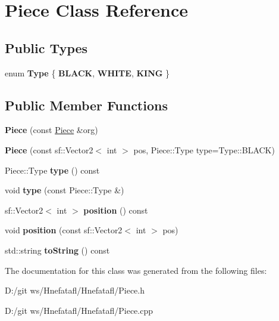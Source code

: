 \hypertarget{class_piece}{\section{Piece Class Reference}
\label{class_piece}
}
\subsection*{Public Types}
\begin{DoxyCompactItemize}
\item 
enum {\bfseries Type} \{ {\bfseries B\-L\-A\-C\-K}, 
{\bfseries W\-H\-I\-T\-E}, 
{\bfseries K\-I\-N\-G}
 \}
\end{DoxyCompactItemize}
\subsection*{Public Member Functions}
\begin{DoxyCompactItemize}
\item 
\hypertarget{class_piece_ade398b866a6f8eca384313ef38adb2b4}{{\bfseries Piece} (const \hyperlink{class_piece}{Piece} \&org)}\label{class_piece_ade398b866a6f8eca384313ef38adb2b4}

\item 
\hypertarget{class_piece_a7814f9f5f8ed57196c3baeca6fbada7c}{{\bfseries Piece} (const sf\-::\-Vector2$<$ int $>$ pos, Piece\-::\-Type type=Type\-::\-B\-L\-A\-C\-K)}\label{class_piece_a7814f9f5f8ed57196c3baeca6fbada7c}

\item 
\hypertarget{class_piece_a4888185e8742c81931da148fa3ff36bd}{Piece\-::\-Type {\bfseries type} () const }\label{class_piece_a4888185e8742c81931da148fa3ff36bd}

\item 
\hypertarget{class_piece_afe3475e61645287242c66949104a2784}{void {\bfseries type} (const Piece\-::\-Type \&)}\label{class_piece_afe3475e61645287242c66949104a2784}

\item 
\hypertarget{class_piece_a22dd5bed371836d889fc9b92b1626c82}{sf\-::\-Vector2$<$ int $>$ {\bfseries position} () const }\label{class_piece_a22dd5bed371836d889fc9b92b1626c82}

\item 
\hypertarget{class_piece_a33a7b407dfb40bdad6a5a4bd5be39b78}{void {\bfseries position} (const sf\-::\-Vector2$<$ int $>$ pos)}\label{class_piece_a33a7b407dfb40bdad6a5a4bd5be39b78}

\item 
\hypertarget{class_piece_a87319cd2ae0dbf73398876d89fba3101}{std\-::string {\bfseries to\-String} () const }\label{class_piece_a87319cd2ae0dbf73398876d89fba3101}

\end{DoxyCompactItemize}


The documentation for this class was generated from the following files\-:\begin{DoxyCompactItemize}
\item 
D\-:/git ws/\-Hnefatafl/\-Hnefatafl/Piece.\-h\item 
D\-:/git ws/\-Hnefatafl/\-Hnefatafl/Piece.\-cpp\end{DoxyCompactItemize}

